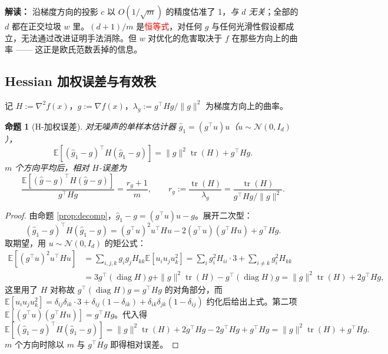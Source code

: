 \documentclass[UTF8]{ctexart}
\newtheorem{proposition}{命题}
\begin{document}
\textbf{解读：} 沿梯度方向的投影 $c$ 以 $O(1/\sqrt m)$ 的精度估准了 1，\emph{与 $d$ 无关}；全部的 $d$ 都在正交垃圾 $w$ 里。$(d+1)/m$ 是\textcolor{red}{恒等式}，对任何 $g$ 与任何光滑性假设都成立，无法通过改进证明手法消除。但 $w$ 对优化的危害取决于 $f$ 在那些方向上的曲率 —— 这正是欧氏范数丢掉的信息。

\subsection{Hessian 加权误差与有效秩}

记 $H := \nabla^2 f(x)$，$g := \nabla f(x)$，$\lambda_g := g^\top H g / \|g\|^2$ 为梯度方向上的曲率。

\begin{proposition}[H-加权误差]
\label{prop:H-error}
对无噪声的单样本估计器 $\widehat g_1 = (g^\top u)u$（$u\sim\mathcal N(0,I_d)$），
\[
\boxed{
\mathbb E[(\widehat g_1 - g)^\top H(\widehat g_1 - g)]
=
\|g\|^2\operatorname{tr}(H) + g^\top H g.
}
\]
$m$ 个方向平均后，相对 $H$-误差为
\[
\boxed{
\frac{\mathbb E[(\widehat g - g)^\top H(\widehat g - g)]}{g^\top H g}
=
\frac{r_g + 1}{m},
\qquad
r_g := \frac{\operatorname{tr}(H)}{\lambda_g} = \frac{\operatorname{tr}(H)}{g^\top H g / \|g\|^2}.
}
\]
\end{proposition}

\begin{proof}
由命题 \ref{prop:decomp}，$\widehat g_1 - g = (g^\top u)u - g$。展开二次型：
\[
(\widehat g_1 - g)^\top H(\widehat g_1 - g)
=
(g^\top u)^2 u^\top H u - 2(g^\top u)(g^\top H u) + g^\top H g.
\]
取期望，用 $u\sim\mathcal N(0,I_d)$ 的矩公式：
\begin{align*}
\mathbb E[(g^\top u)^2 u^\top H u]
&=
\sum_{i,j,k} g_i g_j H_{kk} \mathbb E[u_i u_j u_k^2]
=
\sum_i g_i^2 H_{ii} \cdot 3 + \sum_{i\neq k} g_i^2 H_{kk}\\
&=
3 g^\top (\operatorname{diag} H) g + \|g\|^2 \operatorname{tr}(H) - g^\top(\operatorname{diag} H)g
=
\|g\|^2\operatorname{tr}(H) + 2 g^\top Hg,
\end{align*}
这里用了 $H$ 对称故 $g^\top(\operatorname{diag} H)g = g^\top H g$ 的对角部分，而 $\mathbb E[u_i u_j u_k^2] = \delta_{ij}\delta_{ik}\cdot 3 + \delta_{ij}(1-\delta_{ik}) + \delta_{ik}\delta_{jk}(1-\delta_{ij})$ 约化后给出上式。第二项 $\mathbb E[(g^\top u)(g^\top H u)] = g^\top H g$。代入得
\[
\mathbb E[(\widehat g_1 - g)^\top H(\widehat g_1 - g)]
=
\|g\|^2\operatorname{tr}(H) + 2g^\top H g - 2g^\top H g + g^\top H g
=
\|g\|^2\operatorname{tr}(H) + g^\top H g.
\]
$m$ 个方向时除以 $m$ 与 $g^\top H g$ 即得相对误差。
\end{proof}
\end{document}
